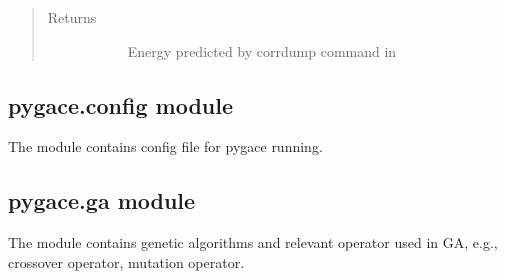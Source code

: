 \documentclass[letterpaper,10pt,english]{sphinxmanual}
\begin{document}
\begin{fulllineitems}
\begin{fulllineitems}
\begin{quote}
\begin{description}
\begin{description}
\end{description}

\item[{Returns}] \leavevmode\begin{description}
\item[{}] \leavevmode
Energy predicted by corrdump command in 

\end{description}

\end{description}\end{quote}

\end{fulllineitems}


\end{fulllineitems}



\subsection{pygace.config module}
\label{\detokenize{pygace:pygace-config-module}}\label{\detokenize{pygace:module-pygace.config}}
The module contains config file for pygace running.


\subsection{pygace.ga module}
\label{\detokenize{pygace:module-pygace.ga}}\label{\detokenize{pygace:pygace-ga-module}}
The module contains genetic algorithms and relevant operator used in GA, e.g.,
crossover operator, mutation operator.
\end{document}
